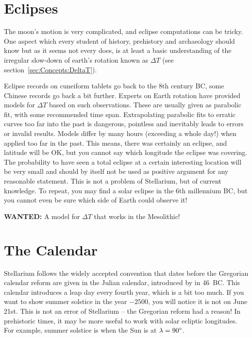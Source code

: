 \section{Eclipses}
\label{sec:Accuracy:Eclipses}

The moon's motion is very complicated, and eclipse computations can be
tricky.  One aspect which every student of history, prehistory and
archaeology should know but as it seems not every does, is at least a
basic understanding of the irregular slow-down of earth's rotation
known as $\Delta T$ (see section~\ref{sec:Concepts:DeltaT}).

Eclipse records on cuneiform tablets go back to the 8th century BC, some Chinese 
records go back a bit further. Experts on Earth rotation have provided models 
for $\Delta T$ based on such observations. These are usually given as parabolic fit, 
with some recommended time span. Extrapolating parabolic fits to erratic curves too far into the past is dangerous, 
pointless and inevitably leads to errors or invalid results. Models differ by many hours (exceeding a whole day!)
when applied too far in the past. This means, there was certainly an eclipse, and latitude will be OK, 
but you cannot say which longitude the eclipse was covering. The probability to have seen a total 
eclipse at a certain interesting location will be very small and should by itself not be used as positive argument 
for any reasonable statement. This is not a problem of Stellarium, 
but of current knowledge. To repeat, you may find a solar eclipse in the 6th millennium BC, 
but you cannot even be sure which side of Earth could observe it!

\textbf{WANTED:} A model for $\Delta T$ that works in the Mesolithic! 

\section{The Calendar}
\label{sec:Accuracy:Calendar}

Stellarium follows the widely accepted convention that dates before the Gregorian calendar 
reform are given in the Julian calendar, introduced by  in 46~BC. 
This calendar introduces a leap day every fourth year, which is a bit too much. 
If you want to show summer solstice in the year $-2500$, you will notice it is not on June 21st. 
This is not an error of Stellarium -- the Gregorian reform had a reason! In prehistoric times, 
it may be more useful to work with solar ecliptic longitudes. For example, summer solstice is
when the Sun is at $\lambda=90\degree$.

